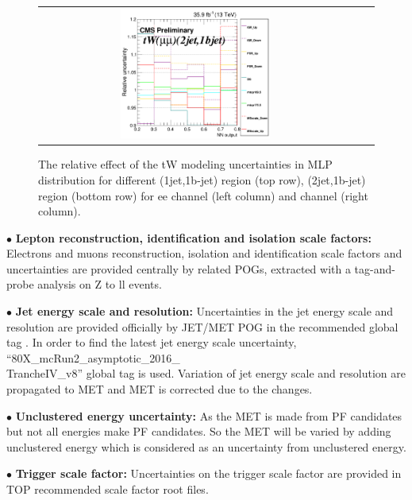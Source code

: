 \begin{figure}[ht]
\begin{center}
\begin{tabular}{ccc}
      \includegraphics[width=0.49\textwidth]{figures/tW/fig/Step2/uncertainties/mumu/TW_Samples_H_MLP_2jet_1bjet_comb.png}\\
    \end{tabular}
    \caption{The relative effect of the tW modeling uncertainties in MLP distribution for different (1jet,1b-jet)  region (top row), (2jet,1b-jet) region (bottom row) for ee channel (left column) and \mumu channel (right column).
    \label{fig:uncert_TW}}
  \end{center}
\end{figure}

\clearpage





$\bullet$ \textbf{Lepton reconstruction, identification and isolation scale factors:} Electrons and muons reconstruction, isolation and identification scale factors and uncertainties are provided centrally by related POGs, extracted with a tag-and-probe analysis on Z to ll events.

$\bullet$ \textbf{Jet energy scale and resolution:} Uncertainties in the jet energy scale and resolution are provided officially by JET/MET POG in the recommended global tag \cite{GT}.
In order to find the latest jet energy scale uncertainty, ``80X\_mcRun2\_asymptotic\_2016\_\\TrancheIV\_v8'' global tag is used.
Variation of jet energy scale and resolution are propagated to MET and MET is corrected due to the changes.

$\bullet$ \textbf{Unclustered energy  uncertainty:} As the MET is made from PF candidates but not all energies make PF candidates. So the MET will be varied by adding unclustered energy which is considered as an uncertainty from unclustered energy.

$\bullet$ \textbf{Trigger scale factor:} Uncertainties on the  trigger scale factor are provided in TOP recommended scale factor root files.


